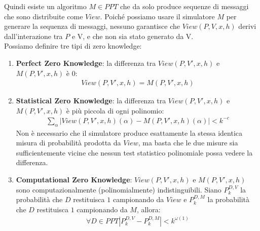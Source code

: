 \noindent Quindi esiste un algoritmo $M \in PPT$ che da solo produce sequenze di messaggi che sono distribuite come $View$. Poiché possiamo usare il simulatore $M$ per generare la sequenza di messaggi, nessuno garantisce che $View(P, V, x, h)$ derivi dall'interazione tra $P$ e V, e che non sia stato generato da V.
\\

\noindent Possiamo definire tre tipi di zero knowledge:
\begin{enumerate}
    \item \textbf{Perfect Zero Knowledge}: la differenza tra $ View(P, V', x, h)$ e $M(P, V', x, h)$ è $0$:
    \begin{align*}
        View(P, V', x, h) = M(P, V', x, h)
    \end{align*}
    \item \textbf{Statistical Zero Knowledge}: la differenza tra $ View(P, V', x, h)$ e $M(P, V', x, h)$ è più piccola di ogni polinomio:
    \begin{align*}
        \sum_\alpha \big| View(P, V', x, h)(\alpha) - M(P, V', x, h)(\alpha) \big| < k^{-c}
    \end{align*}
    Non è necessario che il simulatore produce esattamente la stessa identica misura di probabilità prodotta da $View$, ma basta che le due misure sia sufficientemente vicine che nessun test statistico polinomiale possa vedere la differenza.
    
    \item \textbf{Computational Zero Knowledge}: $ View(P, V', x, h)$ e $M(P, V', x, h)$ sono computazionalmente (polinomialmente) indistinguibili. Siano $P_k^{D, V}$ la probabilità che $D$ restituisca $1$ campionando da $View$ e $P_k^{D, M}$ la probabilità che $D$ restituisca $1$ campionando da $M$, allora:
    \begin{align*}
        \forall D \in PPT \left|P_k^{D, V} - P_k^{D, M}\right| < k^{\omega(1)}
    \end{align*}
\end{enumerate}

